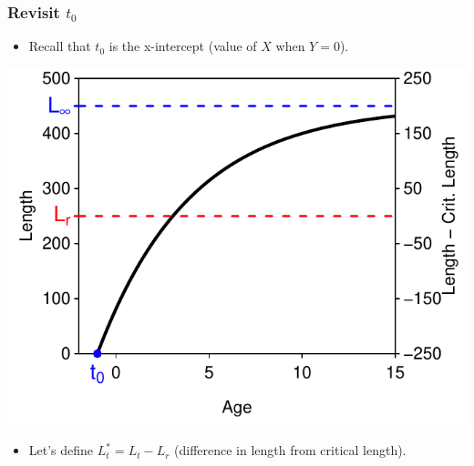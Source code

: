 \documentclass[xcolor=dvipsnames]{beamer}\usepackage[]{graphicx}\usepackage[]{color}
\newenvironment{knitrout}{}{} %
\begin{document}
\begin{frame}[fragile, t]
\frametitle{Revisit $t_{0}$}
  \vspace{-6pt}
  \begin{itemize}
    \item Recall that $t_{0}$ is the x-intercept (value of $X$ when $Y=0$).
  \end{itemize}
\begin{knitrout}\footnotesize
{}\color{fgcolor}

{\centering \includegraphics[width=.5\linewidth]{Figs/redefine3-1} 

}



\end{knitrout}
  \begin{itemize}
    \item Let's define $L^{*}_{t}=L_{t}-L_{r}$ (difference in length from critical length).
  \end{itemize}
\end{frame}
\end{document}
